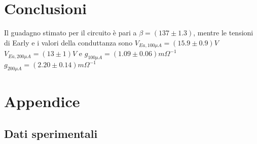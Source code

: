 \documentclass{article}
\begin{document}
\section{Conclusioni}
Il guadagno stimato per il circuito è pari a $\beta=(137\pm1.3)$, mentre le tensioni di Early e i valori della conduttanza sono $V_{Ea,100\mu A}=(15.9\pm 0.9) V$ $V_{Ea,200\mu A}=(13\pm 1) V $ e $g_{100 \mu A}=(1.09 \pm 0.06) m\Omega^{-1} $ $g_{200 \mu A}=(2.20 \pm 0.14) m\Omega^{-1}$
\newpage
\section{Appendice}
\subsection{Dati sperimentali}

\end{document}
